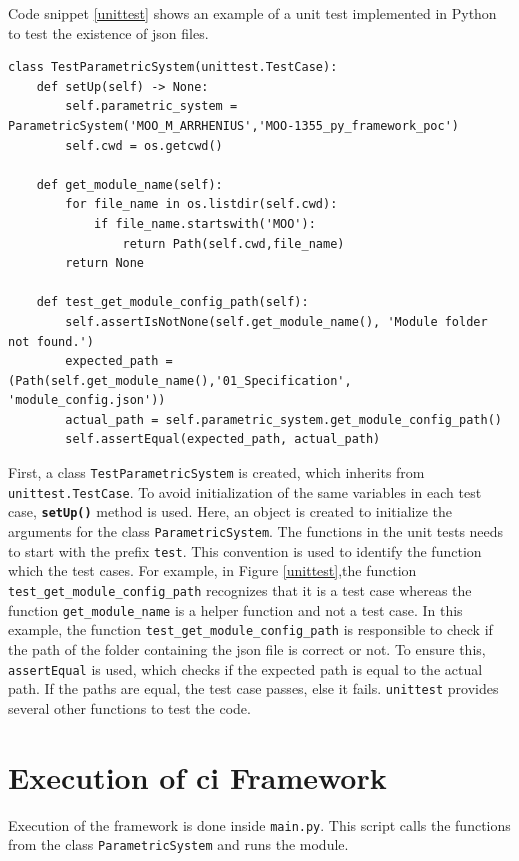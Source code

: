 Code snippet \ref{unittest} shows an example of a unit test implemented in Python to test the existence of \acrshort{json} files. 
\renewcommand{\lstlistingname}{Code}
\begin{lstlisting}[style=pythoncode, caption={Example of a unit test}, label={unittest}]
class TestParametricSystem(unittest.TestCase):
    def setUp(self) -> None:
        self.parametric_system = ParametricSystem('MOO_M_ARRHENIUS','MOO-1355_py_framework_poc')
        self.cwd = os.getcwd()

    def get_module_name(self):
        for file_name in os.listdir(self.cwd):
            if file_name.startswith('MOO'):
                return Path(self.cwd,file_name)
        return None

    def test_get_module_config_path(self):
        self.assertIsNotNone(self.get_module_name(), 'Module folder not found.')
        expected_path = (Path(self.get_module_name(),'01_Specification', 'module_config.json'))
        actual_path = self.parametric_system.get_module_config_path()
        self.assertEqual(expected_path, actual_path)  
\end{lstlisting}

First, a class \texttt{TestParametricSystem} is created, which inherits from \texttt{unittest.TestCase}. To avoid initialization of the same variables in each
test case, \textbf{\texttt{setUp()}} method is used. Here, an object is created to initialize the arguments for the class \texttt{ParametricSystem}.
The functions in the unit tests needs to start with the prefix \texttt{test}. This convention is used to identify the function which the test cases. For example, 
in Figure \ref{unittest},the function \texttt{test\_get\_module\_config\_path} recognizes that it is a test case whereas the function \texttt{get\_module\_name}
is a helper function and not a test case. In this example, the function \texttt{test\_get\_module\_config\_path} is responsible to check if the path of the folder
containing the \acrshort{json} file is correct or not. To ensure this, \texttt{assertEqual} is used, which checks if the expected path is equal to the 
actual path. If the paths are equal, the test case passes, else it fails. \texttt{unittest} provides several other functions to test the code. 

\section{Execution of \acrshort{ci} Framework}
Execution of the framework is done inside \texttt{main.py}. This script calls the functions
from the class \texttt{ParametricSystem} and runs the module.


